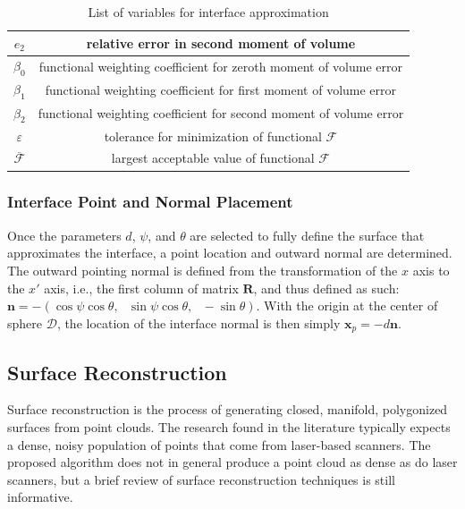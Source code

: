 \begin{table}[htbp!]
\begin{tabular}{|c||c|}
   $e_2$ & relative error in second moment of volume \\ \hline   
   $\beta_0$ & functional weighting coefficient for zeroth moment of volume error \\ \hline
   $\beta_1$ & functional weighting coefficient for first moment of volume error \\ \hline
   $\beta_2$ & functional weighting coefficient for second moment of volume error \\ \hline 
   $\varepsilon$ & tolerance for minimization of functional $\mathcal{F}$ \\ \hline
   $\overline{\mathcal{F}}$ \rule{0mm}{4mm} & largest acceptable value of functional $\mathcal{F}$ \\ \hline        
\end{tabular}
\caption{List of variables for interface approximation}
\label{tab:surface}
\end{table}

\subsubsection{Interface Point and Normal Placement}

Once the parameters $d$, $\psi$, and $\theta$ are selected to fully define the surface that approximates the interface, a point location and outward normal are determined. The outward pointing normal is defined from the transformation of the $x$ axis to the $x'$ axis, i.e., the first column of matrix $\bm{R}$, and thus defined as such: $\bm{n} = -(\cos\psi\cos\theta,\text{\ }\sin\psi\cos\theta,\text{\ }-\sin\theta)$. With the origin at the center of sphere $\mathcal{D}$, the location of the interface normal is then simply $\mathbf{x}_p = -d\bm{n}$.

\subsection{Surface Reconstruction}
\label{Surface Reconstruction}

Surface reconstruction is the process of generating closed, manifold, polygonized surfaces from point clouds. The research found in the literature typically expects a dense, noisy population of points that come from laser-based scanners. The proposed algorithm does not in general produce a point cloud as dense as do laser scanners, but a brief review of surface reconstruction techniques is still informative.

